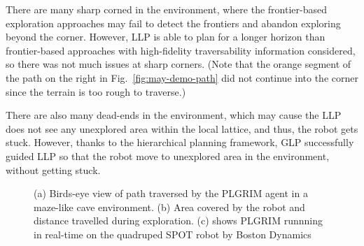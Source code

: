 \documentclass{article}
\begin{document}
There are many sharp corned in the environment, where the frontier-based exploration approaches may fail to detect the frontiers and abandon exploring beyond the corner.
However, LLP is able to plan for a longer horizon than frontier-based approaches with high-fidelity traversability information considered, so there was not much issues at sharp corners.
(Note that the orange segment of the path on the right in Fig.~\ref{fig:may-demo-path} did not continue into the corner since the terrain is too rough to traverse.)

There are also many dead-ends in the environment, which may cause the LLP does not see any unexplored area within the local lattice, and thus, the robot gets stuck.
However, thanks to the hierarchical planning framework, GLP successfully guided LLP so that the robot move to unexplored area in the environment, without getting stuck.

\begin{figure}[t!]
  \centering
  \caption{(a) Birds-eye view of path traversed by the PLGRIM agent in a maze-like cave environment. (b) Area covered by the robot and distance travelled during exploration. (c) shows PLGRIM runnning in real-time on the quadruped SPOT robot by Boston Dynamics}
\end{figure}
\end{document}
